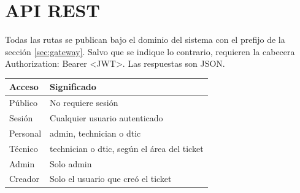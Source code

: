 \documentclass[11pt,a4paper,oneside]{report}
\newcommand{\codus}{\textunderscore\allowbreak}
\DeclareRobustCommand{\cod}[1]{{\small\ttfamily\let\_\codus #1}}
\newcommand{\cabecera}{\rowcolor{utaRojo!12}}
\begin{document}
\chapter{API REST}\label{cap:api}

Todas las rutas se publican bajo el dominio del sistema con el prefijo de la sección
\ref{sec:gateway}. Salvo que se indique lo contrario, requieren la cabecera
\cod{Authorization: Bearer <JWT>}. Las respuestas son JSON.

\begin{center}
\small
\begin{tabularx}{\linewidth}{@{}P{2.3cm}L@{}}
\toprule
\cabecera \textbf{Acceso} & \textbf{Significado} \\
\midrule
Público & No requiere sesión \\
Sesión & Cualquier usuario autenticado \\
Personal & \cod{admin}, \cod{technician} o \cod{dtic} \\
Técnico & \cod{technician} o \cod{dtic}, según el área del ticket \\
Admin & Solo \cod{admin} \\
Creador & Solo el usuario que creó el ticket \\
\bottomrule
\end{tabularx}
\end{center}
\end{document}
